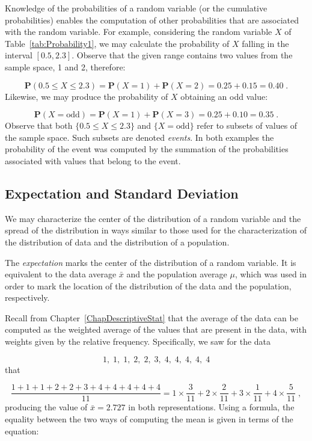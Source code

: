 \documentclass[
]{krantz}
\newcommand{\Prob}{\mathbf{P}}
\theoremstyle{definition}
\theoremstyle{definition}
\theoremstyle{definition}
\theoremstyle{remark}
\begin{document}
Knowledge of the probabilities of a random variable (or the cumulative
probabilities) enables the computation of other probabilities that are
associated with the random variable. For example, considering the random
variable \(X\) of Table~\ref{tab:Probability1}, we may calculate the
probability of \(X\) falling in the interval \([0.5, 2.3]\). Observe that
the given range contains two values from the sample space, 1 and 2,
therefore:

\[\Prob(0.5 \leq X \leq 2.3) = \Prob(X=1) + \Prob(X = 2) = 0.25 + 0.15 = 0.40\;.\]
Likewise, we may produce the probability of \(X\) obtaining an odd value:

\[\Prob(X = \mbox{odd}) = \Prob(X=1) + \Prob(X=3) = 0.25 + 0.10 = 0.35\;.\]
Observe that both \(\{0.5 \leq X \leq 2.3\}\) and \(\{X = \mbox{odd}\}\)
refer to subsets of values of the sample space. Such subsets are denoted
\emph{events}. In both examples the probability of the event was computed by
the summation of the probabilities associated with values that belong to
the event.

\hypertarget{expectation-and-standard-deviation}{%
\subsection{Expectation and Standard Deviation}\label{expectation-and-standard-deviation}}

We may characterize the center of the distribution of a random variable
and the spread of the distribution in ways similar to those used for the
characterization of the distribution of data and the distribution of a
population.

The \emph{expectation} marks the center of the distribution of a random
variable. It is equivalent to the data average \(\bar x\) and the
population average \(\mu\), which was used in order to mark the location
of the distribution of the data and the population, respectively.

Recall from Chapter~\ref{ChapDescriptiveStat} that the average of the data
can be computed as the weighted average of the values that are present
in the data, with weights given by the relative frequency. Specifically,
we saw for the data

\[1,\; 1,\; 1,\; 2,\; 2,\; 3,\; 4,\; 4,\; 4,\; 4,\; 4\] that

\[\frac{1 + 1 + 1 + 2 + 2 + 3 + 4 + 4 + 4 + 4 + 4}{11} =
1\times \frac{3}{11} + 2 \times \frac{2}{11} + 3 \times \frac{1}{11} + 4 \times \frac{5}{11}\;,\]
producing the value of \(\bar x =2.727\) in both representations. Using a
formula, the equality between the two ways of computing the mean is
given in terms of the equation:
\end{document}

